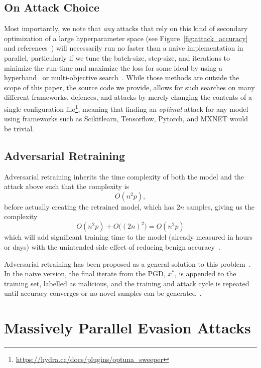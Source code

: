 \documentclass[fonts]{icst}
\begin{document}
\subsection{On Attack Choice}

Most importantly, we note that \textit{any} attacks that rely on this kind of secondary optimization of a large hyperparameter space (see Figure~\ref{fig:attack_accuracy} and references~\cite{su2019one,carlini2017towards,chen2020hopskipjumpattack,brown2017adversarial,brendel2017decision,croce2020reliable,liu2018dpatch,qin2019imperceptible,grosse2018limitations,kotyan2019adversarial,chen2017zoo}) will necessarily run no faster than a naive implementation in parallel, particularly if we tune the batch-size, step-size, and iterations to minimize the run-time and maximize the loss for some ideal by using a hyperband~\cite{li2017hyperband} or multi-objective search~\cite{hansen2016cma,ozaki2022multiobjective}.
While those methods are outside the scope of this paper, the source code we provide, allows for such searches on many different frameworks, defences, and attacks by merely changing the contents of a single configuration file\footnote{\href{https://hydra.cc/docs/plugins/optuna_sweeper/}{https://hydra.cc/docs/plugins/optuna\_sweeper}}, meaning that finding an \textit{optimal} attack for any model using frameworks such as Scikitlearn, Tensorflow, Pytorch, and MXNET would be trivial.

\subsection{Adversarial Retraining}
\label{retrain}
Adversarial retraining inherits the time complexity of both the model and the attack above such that the complexity is
$$
    O(n^2p),
$$
before actually creating the retrained model, which has $2n$ samples, giving us the complexity
$$
    O(n^2p) + O\big((2n)^2\big) = O(n^2p)
$$
which will add significant training time to the model (already measured in hours or days) with the unintended side effect of reducing benign accuracy~\cite{stutz2019confidence}.

Adversarial retraining has been proposed as a general solution to this problem~\cite{li2016general,stutz2019confidence}.
In the naive version, the final iterate from the PGD, $x^{*}$, is appended to the training set, labelled as malicious, and the training and attack cycle is repeated until accuracy converges or no novel samples can be generated~\cite{li2016general}.

\section{Massively Parallel Evasion Attacks}
\end{document}
